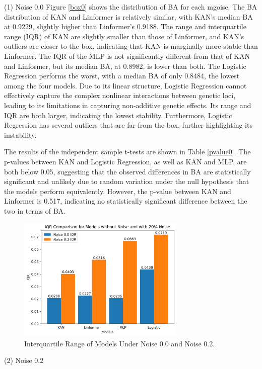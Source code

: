 \documentclass{article}
\begin{document}
(1) Noise 0.0
Figure \ref{box0} shows the distribution of BA for each mgoise. The BA distribution of KAN and Linformer is relatively similar, with KAN's median BA at 0.9229, slightly higher than Linformer's 0.9188. The range and interquartile range (IQR) of KAN are slightly smaller than those of Linformer, and KAN's outliers are closer to the box, indicating that KAN is marginally more stable than Linformer. The IQR of the MLP is not significantly different from that of KAN and Linformer, but its median BA, at 0.8982, is lower than both. The Logistic Regression performs the worst, with a median BA of only 0.8484, the lowest among the four models. Due to its linear structure, Logistic Regression cannot effectively capture the complex nonlinear interactions between genetic loci, leading to its limitations in capturing non-additive genetic effects. Its range and IQR are both larger, indicating the lowest stability. Furthermore, Logistic Regression has several outliers that are far from the box, further highlighting its instability.

The results of the independent sample t-tests are shown in Table \ref{pvalue0}. The p-values between KAN and Logistic Regression, as well as KAN and MLP, are both below 0.05, suggesting that the observed differences in BA are statistically significant and unlikely due to random variation under the null hypothesis that the models perform equivalently. However, the p-value between KAN and Linformer is 0.517, indicating no statistically significant difference between the two in terms of BA.



\begin{figure}[ht]
\centering
\includegraphics[width=8cm]{images/5_boxplot_IQR.jpg}
\caption{Interquartile Range of Models Under Noise 0.0 and Noise 0.2.}
\label{IQR}
\end{figure}


(2) Noise 0.2
\end{document}
